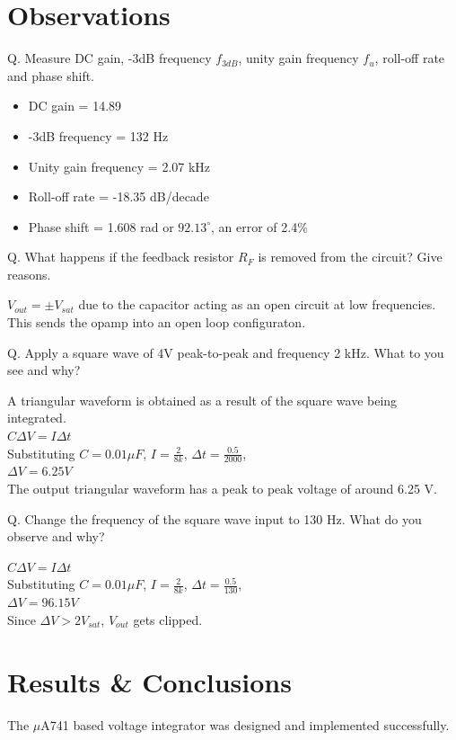 \documentclass[12pt, titlepage]{article}
\theoremstyle{definition}
\begin{document}
  \newpage
  \section{Observations}
    Q. Measure DC gain, -3dB frequency $f_{3dB}$, unity gain frequency $f_u$, roll-off rate and phase shift.

    \begin{itemize}
      \item[] DC gain = 14.89
      \item[] -3dB frequency = 132 Hz
      \item[] Unity gain frequency = 2.07 kHz
      \item[] Roll-off rate = -18.35 dB/decade
      \item[] Phase shift = 1.608 rad or $92.13^{\circ}$, an error of 2.4\%
    \end{itemize}

    Q. What happens if the feedback resistor $R_{F}$ is removed from the circuit? Give reasons.

    $V_{out}=\pm V_{sat}$ due to the capacitor acting as an open circuit at low frequencies. This sends the opamp into an open loop configuraton.

    Q. Apply a square wave of 4V peak-to-peak and frequency 2 kHz. What to you see and why?

    A triangular waveform is obtained as a result of the square wave being integrated. \\

$C\Delta V=I\Delta t$\\
Substituting $C=0.01\mu F$, $I=\frac{2}{8k}$, $\Delta t=\frac{0.5}{2000}$, \\
$\Delta V = 6.25 V$\\
The output triangular waveform has a peak to peak voltage of around 6.25 V.

    Q. Change the frequency of the square wave input to 130 Hz. What do you observe and why?

    $C\Delta V=I\Delta t$\\
Substituting $C=0.01\mu F$, $I=\frac{2}{8k}$, $\Delta t=\frac{0.5}{130}$, \\
$\Delta V = 96.15 V$ \\
Since $\Delta V > 2V_{sat}$, $V_{out}$ gets clipped.


  \newpage
  \section{Results \& Conclusions}
    The $\mu$A741 based voltage integrator was designed and implemented successfully.
\end{document}
